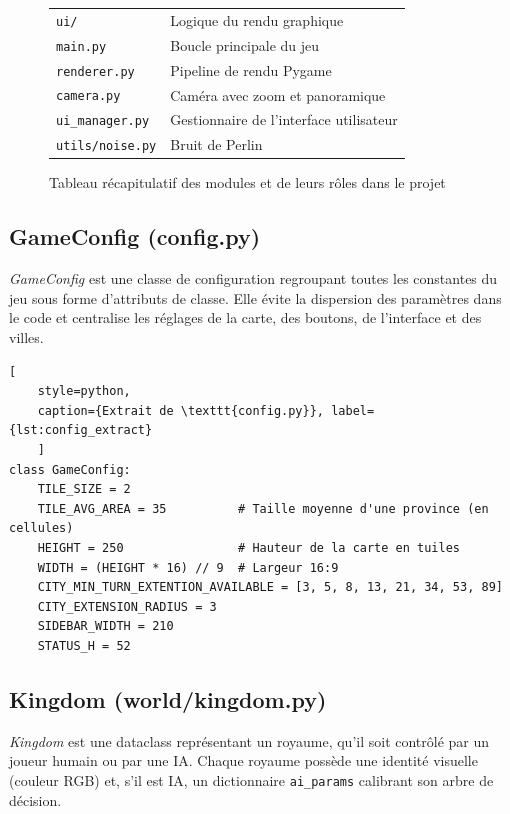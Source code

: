 \documentclass[12pt, a4paper]{article}
\begin{document}
\begin{figure}[H]
\begin{center}
\begin{tabular}{ll}
    \texttt{ui/} & Logique du rendu graphique \\
    \texttt{\phantom{ui}main.py} & Boucle principale du jeu \\
    \texttt{\phantom{ui}renderer.py} & Pipeline de rendu Pygame \\
    \texttt{\phantom{ui}camera.py} & Caméra avec zoom et panoramique \\
    \texttt{\phantom{ui}ui\_manager.py} & Gestionnaire de l'interface utilisateur \\
    \texttt{utils/noise.py} & Bruit de Perlin \\
    \bottomrule
    \end{tabular}
    \end{center}
    \caption{Tableau récapitulatif des modules et de leurs rôles dans le projet}
    \label{fig:tableau_modules}
\end{figure}

\subsection{GameConfig (config.py)}

\textit{GameConfig} est une classe de configuration regroupant toutes les constantes du jeu sous forme d'attributs de
classe. Elle évite la dispersion des paramètres dans le code et centralise les réglages de la
carte, des boutons, de l'interface et des villes.

\begin{lstlisting}[
    style=python,
    caption={Extrait de \texttt{config.py}}, label={lst:config_extract}
    ]
class GameConfig:
    TILE_SIZE = 2
    TILE_AVG_AREA = 35          # Taille moyenne d'une province (en cellules)
    HEIGHT = 250                # Hauteur de la carte en tuiles
    WIDTH = (HEIGHT * 16) // 9  # Largeur 16:9
    CITY_MIN_TURN_EXTENTION_AVAILABLE = [3, 5, 8, 13, 21, 34, 53, 89]
    CITY_EXTENSION_RADIUS = 3
    SIDEBAR_WIDTH = 210
    STATUS_H = 52
\end{lstlisting}

\subsection{Kingdom (world/kingdom.py)}

\textit{Kingdom} est une dataclass représentant un royaume, qu'il soit contrôlé par un joueur humain ou par une IA.
Chaque royaume possède une identité visuelle (couleur RGB) et, s'il est IA, un dictionnaire
\texttt{ai\_params} calibrant son arbre de décision.
\end{document}
